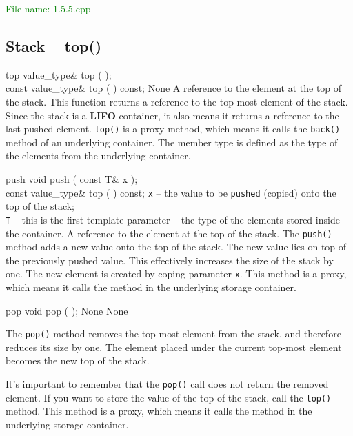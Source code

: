 \textcolor{green}{File name: 1.5.5.cpp}


\subsection{Stack – top()} %
\begin{methodinfo}
  {top}
  {value_type& top ( ); \\
  const value_type& top ( ) const;}
  {None}
  {A reference to the element at the top of the stack.}
  {This function returns a reference to the top-most element of the stack. Since the stack is 
  a \textbf{LIFO} container, it also means it returns a reference to the last pushed element.
  \texttt{top()} is a proxy method, which means it calls the \texttt{back()} method of an underlying container. 
  The member type  is defined as the type of the elements from the underlying container.}
\end{methodinfo}

\begin{methodinfo}
  {push}
  {void push ( const T& x ); \\
  const value_type& top ( ) const;}
  {\texttt{x} – the value to be \texttt{pushed} (copied) onto the top of the stack; \\
    \texttt{T} – this is the first template parameter – the type of the elements stored inside the container.}
  {A reference to the element at the top of the stack.}
  {The \texttt{push()} method adds a new value onto the top of the stack. The new value lies on top of 
  the previously pushed value. This effectively increases the size of the stack by one. The new element 
  is created by coping parameter \texttt{x}. This method is a proxy, which means it calls the 
   method in the underlying storage container.}
\end{methodinfo}
\begin{methodinfo}
  {pop}
  {void pop ( );}
  {None}
  {None}
  {The \texttt{pop()} method removes the top-most element from the stack, and therefore reduces 
  its size by one. The element placed under the current top-most element becomes the new top of the stack.

  It’s important to remember that the \texttt{pop()} call does not return the removed element. 
  If you want to store the value of the top of the stack, call the \texttt{top()} method. This method 
  is a proxy, which means it calls the  method in the underlying storage container.}
\end{methodinfo}

